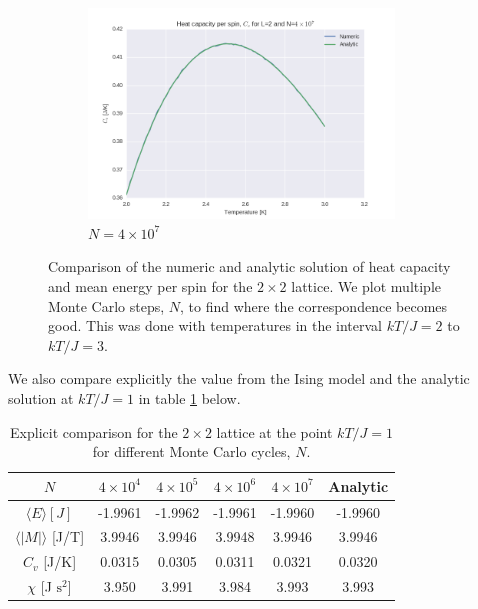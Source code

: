 \documentclass[a4paper, 10pt]{article}
\begin{document}
\begin{figure}[!ht]
\begin{subfigure}[H!]{0.5\textwidth}
        \includegraphics[height=2.2in]{L2Cv4e7.png}
        \caption{$N=4\times 10^7$}
    \end{subfigure}
    \caption{Comparison of the numeric and analytic solution of heat capacity and mean energy per spin for the $2\times 2$ lattice. We plot multiple Monte Carlo steps, $N$, to find where the correspondence becomes good. This was done with temperatures in the interval $kT/J=2$ to $kT/J=3$.}\label{fig:2x2_nsteps}
\end{figure}
\linebreak
We also compare explicitly the value from the Ising model and the analytic solution at $kT/J=1$ in table \ref{tab:2x2_compare} below.
\newpage
\begin{table}[!ht]
\centering
\caption{Explicit comparison for the $2 \times 2$ lattice at the point $kT/J=1$ for different Monte Carlo cycles, $N$.}\label{tab:2x2_compare}
\begin{tabular}{|c|ccccc|}
\hline
$N$ & $4 \times 10^4$ & $4\times 10^5$ & $4\times 10^6$ & $4 \times 10^7$ & Analytic\\ 
\hline
$ \langle E \rangle [J]$ &  -1.9961 & -1.9962 & -1.9961 & -1.9960 & -1.9960\\
$\langle |M|\rangle $ [J/T] &3.9946 &  3.9946 &3.9948 & 3.9946 & 3.9946\\
$C_v$ [J/K] &0.0315 & 0.0305 & 0.0311 & 0.0321 & 0.0320 \\
$\chi$ [J $\mathrm{s}^2$] &3.950 & 3.991 & 3.984 & 3.993 & 3.993 \\
\hline
\end{tabular}
\end{table}
\end{document}
